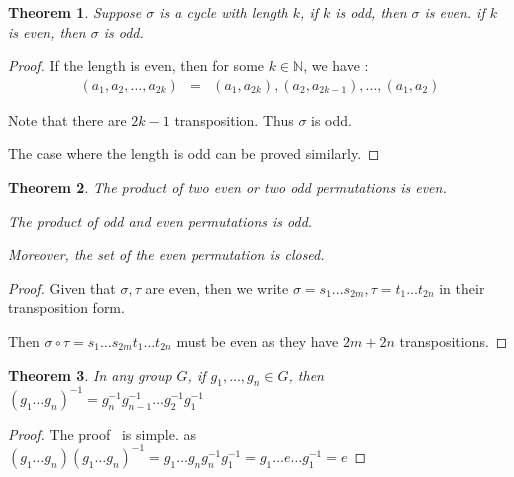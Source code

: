 \documentclass{article}
\theoremstyle{MyNonumberplain}
\theoremstyle{break}
\newtheorem*{proof}{Proof. }
\theoremstyle{break}
\newtheorem{theorem}{Theorem}[section]
\theoremstyle{break}
\theoremstyle{definition}
\theoremstyle{break}
\begin{document}
\begin{thmbox}
    \begin{theorem}
        Suppose $\sigma$ is a cycle with length $k$, if $k$ is odd, then $\sigma$ is even. if $k$ is even, then $\sigma$ is odd.
    \end{theorem}
    \begin{prfbox}
        \begin{proof}
            If the length is even, then for some $k \in \mathbb{N}$, we have :
            \begin{eqnarray*}
                (a_1, a_2, \ldots, a_{2 k}) & = & (a_1, a_{2 k}), (a_2, a_{2 k - 1}),
                \ldots, (a_1, a_2)
            \end{eqnarray*}

            Note that there are $2 k - 1$ transposition. Thus $\sigma$ is odd. \bigskip

            The case where the length is odd can be proved similarly.
        \end{proof}
    \end{prfbox}
\end{thmbox}

\begin{thmbox}
    \begin{theorem}
        The product of two even or two odd permutations is even.\bigskip

        The product of odd and even permutations is odd.\bigskip

        Moreover, the set of the even permutation is closed.
    \end{theorem}
    \begin{prfbox}
        \begin{proof}
            Given that $\sigma, \tau$ are even, then we write $\sigma = s_1 \ldots s_{2
            m}, \tau = t_1 \ldots t_{2 n}$ in their transposition form.\bigskip

            Then $\sigma \circ \tau = s_1 \ldots s_{2 m} t_1 \ldots t_{2 n}$ must be even
            as they have $2 m + 2 n$ transpositions.
        \end{proof}
    \end{prfbox}
\end{thmbox}

\begin{thmbox}
    \begin{theorem}
        In any group $G$, if $g_1, \ldots, g_n \in G$, then $(g_1 \ldots g_n)^{- 1} = g^{- 1}_n g^{- 1}_{n - 1} \ldots g^{- 1}_2 g^{- 1}_1$
    \end{theorem}
    \begin{prfbox}
        \begin{proof}
            The proof \ is simple. as $(g_1 \ldots g_n) (g_1 \ldots g_n)^{- 1} = g_1 \ldots g_n g^{- 1}_n g^{- 1}_1 = g_1 \ldots e \ldots g^{- 1}_1 = e$
        \end{proof}
    \end{prfbox}
\end{thmbox}
\end{document}
